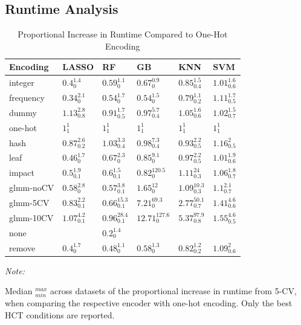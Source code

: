 \documentclass[smallextended]{svjour3}       %
\begin{document}
\hypertarget{runtime-analysis}{%
\subsection{Runtime Analysis}\label{runtime-analysis}}

\begin{table}

\caption{\label{tab:time-ranks}Proportional Increase in Runtime Compared to One-Hot Encoding}
\centering
\begin{threeparttable}
\begin{tabular}[t]{l|l|l|l|l|l}
\hline
Encoding & LASSO & RF & GB & KNN & SVM\\
\hline
integer & $0.4_{0}^{1.4}$ & $0.59_{0}^{1.1}$ & $0.67_{0}^{0.9}$ & $0.85_{0.4}^{1.5}$ & $1.01_{0.6}^{1.6}$\\
\hline
frequency & $0.34_{0}^{2.1}$ & $0.54_{0}^{1.7}$ & $0.54_{0}^{1.5}$ & $0.79_{0.2}^{1.1}$ & $1.11_{0.5}^{1.7}$\\
\hline
dummy & $1.13_{0.8}^{2.8}$ & $0.91_{0.5}^{1.7}$ & $0.97_{0.4}^{5.7}$ & $1.05_{0.6}^{1.6}$ & $1.02_{0.7}^{1.5}$\\
\hline
one-hot & $1_{1}^{1}$ & $1_{1}^{1}$ & $1_{1}^{1}$ & $1_{1}^{1}$ & $1_{1}^{1}$\\
\hline
hash & $0.87_{0.2}^{2.6}$ & $1.03_{0.4}^{3.3}$ & $0.98_{0.4}^{7.3}$ & $0.93_{0.5}^{2.2}$ & $1.16_{0.5}^{2}$\\
\hline
leaf & $0.46_{0}^{1.7}$ & $0.67_{0}^{2.3}$ & $0.85_{0}^{9.1}$ & $0.97_{0.5}^{2.2}$ & $1.01_{0.6}^{1.9}$\\
\hline
impact & $0.5_{0.1}^{1.9}$ & $0.6_{0.1}^{1.5}$ & $0.82_{0}^{120.5}$ & $1.11_{0.3}^{24}$ & $1.06_{0.7}^{1.8}$\\
\hline
glmm-noCV & $0.58_{0}^{2.8}$ & $0.57_{0.1}^{3.8}$ & $1.65_{0}^{12}$ & $1.09_{0.3}^{10.3}$ & $1.1_{0.7}^{2.1}$\\
\hline
glmm-5CV & $0.83_{0.1}^{2.2}$ & $0.66_{0.1}^{15.3}$ & $7.21_{0}^{69.3}$ & $2.77_{0.7}^{50.1}$ & $1.41_{0.6}^{4.6}$\\
\hline
glmm-10CV & $1.07_{0.1}^{4.2}$ & $0.96_{0.1}^{28.4}$ & $12.71_{0}^{127.6}$ & $5.37_{0.8}^{97.9}$ & $1.55_{0.5}^{4.6}$\\
\hline
none &  & $0.2_{0}^{1.4}$ &  &  & \\
\hline
remove & $0.4_{0}^{1.7}$ & $0.48_{0}^{1.1}$ & $0.58_{0}^{1.3}$ & $0.82_{0.2}^{1.2}$ & $1.09_{0.6}^{2}$\\
\hline
\end{tabular}
\begin{tablenotes}
\item \textit{Note: } 
\item Median $_{min}^{max}$ across datasets of the proportional increase in runtime from 5-CV, when comparing the respective encoder with one-hot encoding. Only the best HCT conditions are reported.
\end{tablenotes}
\end{threeparttable}
\end{table}
\end{document}
